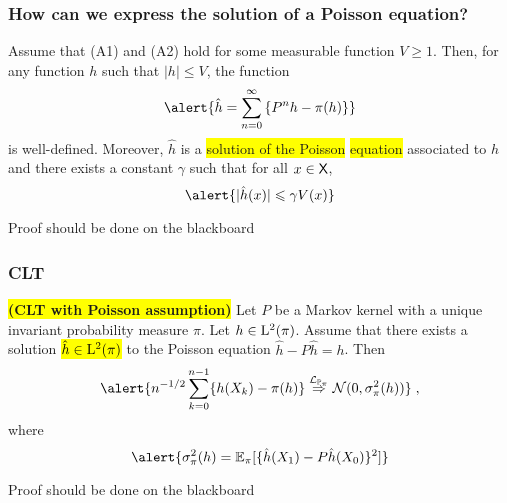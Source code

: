 \documentclass[usenames,dvipsnames]{beamer}
\newcommand\mycolthree[1]{{\color{Emerald}#1}}
\newcommand\colbox[1]{\colorbox{Yellow}{#1}}
\begin{document}
\begin{frame}
    \frametitle{How can we express the solution of a Poisson equation?}
    \begin{theorem} \label{thm:solPoiss}
        Assume that (A1) and (A2) hold for some measurable function $V\geq 1$. Then, for any function $h$ such that $|h|\leq V$, the function
       \begin{equation}\label{eq:solPoisson}
        \alert{\hat h=\sum_{n=0}^\infty \lrcb{P^n h-\pi(h)}}
       \end{equation}
       is well-defined. Moreover, $\hat h$ is a \colbox{solution of the Poisson} \colbox{ equation} associated to $h$ and there exists a constant $\gamma$ such that  for all $x\in\mathsf{X}$,
       $$
       \alert{|\hat h(x)|\leq \gamma V(x)}
       $$
        \end{theorem}
        \mycolthree{Proof should be done on the blackboard}
\end{frame}

\begin{frame}
    \frametitle{CLT}
    \begin{theorem}{\colbox{\bf (CLT with Poisson assumption)}}
        \label{thm:clt-poisson} 
        Let $P$ be a  Markov kernel with a unique invariant probability measure $\pi$. Let
        $h \in \mathrm{L}^2(\pi)$. Assume that there exists a solution
        \colbox{$\hat{h} \in \mathrm{L}^2(\pi)$} to the Poisson equation $\hat{h} - P \hat{h} = h$. \pause Then
        \begin{align*}
            \alert{n^{-1/2} \sum_{k=0}^{n-1} \{h(X_k)-\pi(h)\} \dlim{\PP_\pi} \gauss(0,\sigma_\pi^2(h))} \eqsp ,
        \end{align*}
        where
        \begin{equation}
        \label{eq:equality-variance}
        \alert{\sigma_\pi^2(h) = \PE_\pi[ \{\hat{h}(X_1)-P\hat{h}(X_0)\}^2]} %
        \end{equation}
      \end{theorem}
      \mycolthree{Proof should be done on the blackboard}
    

\end{frame}
\end{document}
